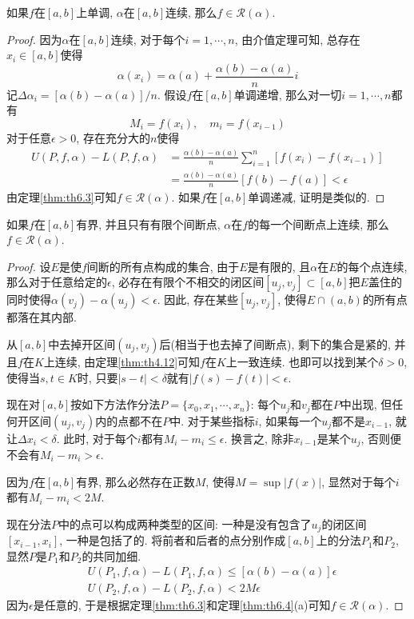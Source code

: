 \documentclass[cn,12pt,math=mtpro2,citestyle=gb7714-2015,bibstyle=gb7714-2015,twocol]{elegantbook}
\begin{document}
\begin{theorem}
  如果$f$在$[a,b]$上单调, $\alpha$在$[a,b]$连续, 那么$f\in\mathscr{R}(\alpha)$.
\end{theorem}
\begin{proof}
  因为$\alpha$在$[a,b]$连续, 对于每个$i=1,\cdots,n$, 由介值定理可知, 总存在$x_i\in[a,b]$使得
  $$\alpha(x_i)=\alpha(a)+\frac{\alpha(b)-\alpha(a)}{n}i$$
  记$\Delta\alpha_i=[\alpha(b)-\alpha(a)]/n$. 假设$f$在$[a,b]$单调递增, 那么对一切$i=1,\cdots,n$都有
  $$M_i=f(x_i),\quad m_i=f(x_{i-1})$$
  对于任意$\epsilon>0$, 存在充分大的$n$使得
  \begin{align*}
  U(P,f,\alpha)-L(P,f,\alpha)&=\frac{\alpha(b)-\alpha(a)}{n}\sum_{i=1}^{n}[f(x_i)-f(x_{i-1})] \\
  &=\frac{\alpha(b)-\alpha(a)}{n}[f(b)-f(a)]<\epsilon
  \end{align*}
  由定理\ref{thm:th6.3}可知$f\in\mathscr{R}(\alpha)$. 如果$f$在$[a,b]$单调递减, 证明是类似的.


\end{proof}
\begin{theorem}\label{thm:th6.14}
  如果$f$在$[a,b]$有界, 并且只有有限个间断点, $\alpha$在$f$的每一个间断点上连续, 那么$f\in\mathscr{R}(\alpha)$.
\end{theorem}
\begin{proof}
  设$E$是使$f$间断的所有点构成的集合, 由于$E$是有限的, 且$\alpha$在$E$的每个点连续, 那么对于任意给定的$\epsilon$, 必存在有限个不相交的闭区间$[u_j,v_j]\subset[a,b]$把$E$盖住的同时使得$\alpha(v_j)-\alpha(u_j)<\epsilon$. 因此, 存在某些$[u_j,v_j]$, 使得$E\cap (a,b)$的所有点都落在其内部.

  从$[a,b]$中去掉开区间$(u_j,v_j)$后(相当于也去掉了间断点), 剩下的集合是紧的, 并且$f$在$K$上连续, 由定理\ref{thm:th4.12}可知$f$在$K$上一致连续. 也即可以找到某个$\delta>0$, 使得当$s, t\in K$时, 只要$|s-t|<\delta$就有$|f(s)-f(t)|<\epsilon$.

  现在对$[a,b]$按如下方法作分法$P=\{x_0,x_1,\cdots,x_n\}$: 每个$u_j$和$v_j$都在$P$中出现, 但任何开区间$(u_j,v_j)$内的点都不在$P$中. 对于某些指标$i$, 如果每一个$u_j$都不是$x_{i-1}$, 就让$\Delta x_i<\delta$. 此时, 对于每个$i$都有$M_i-m_i\leq\epsilon$. 换言之, 除非$x_{i-1}$是某个$u_j$, 否则便不会有$M_i-m_i>\epsilon$.

  因为$f$在$[a,b]$有界, 那么必然存在正数$M$, 使得$M=\sup |f(x)|$, 显然对于每个$i$都有$M_i-m_i<2M$.

  现在分法$P$中的点可以构成两种类型的区间: 一种是没有包含了$u_j$的闭区间$[x_{i-1},x_i]$, 一种是包括了的. 将前者和后者的点分别作成$[a,b]$上的分法$P_1$和$P_2$, 显然$P$是$P_1$和$P_2$的共同加细.
  \begin{align*}
  &U(P_1,f,\alpha)-L(P_1,f,\alpha)\leq [\alpha(b)-\alpha(a)]\epsilon \\
  &U(P_2,f,\alpha)-L(P_2,f,\alpha)<2M\epsilon
  \end{align*}
  因为$\epsilon$是任意的, 于是根据定理\ref{thm:th6.3}和定理\ref{thm:th6.4}(a)可知$f\in\mathscr{R}(\alpha)$.

\end{proof}
\end{document}
